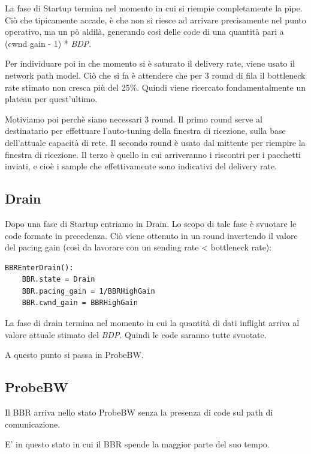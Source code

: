 La fase di Startup termina nel momento in cui si riempie completamente la pipe. Ciò che tipicamente accade, è che non si riesce ad arrivare precisamente nel punto operativo, ma un pò aldilà, generando così delle code di una quantità pari a (cwnd gain - 1) * \textit{BDP}. \bigskip

Per individuare poi in che momento si è saturato il delivery rate, viene usato il network path model.
Ciò che si fa è attendere che per 3 round di fila il bottleneck rate stimato non cresca più del 25\%. Quindi viene ricercato fondamentalmente un plateau per quest'ultimo. \bigskip

Motiviamo poi perchè siano necessari 3 round. Il primo round serve al destinatario per effettuare l'auto-tuning della finestra di ricezione, sulla base dell'attuale capacità di rete. Il secondo round è usato dal mittente per riempire la finestra di ricezione. Il terzo è quello in cui arriveranno i riscontri per i pacchetti inviati, e cioè i sample che effettivamente sono indicativi del delivery rate.

\subsection{Drain}

Dopo una fase di Startup entriamo in Drain. Lo scopo di tale fase è svuotare le code formate in precedenza. Ciò viene ottenuto in un round invertendo il valore del pacing gain (così da lavorare con un sending rate < bottleneck rate):

\begin{lstlisting}[caption=BBREnterDrain]
BBREnterDrain():
	BBR.state = Drain
	BBR.pacing_gain = 1/BBRHighGain
	BBR.cwnd_gain = BBRHighGain

\end{lstlisting}

La fase di drain termina nel momento in cui la quantità di dati inflight arriva al valore attuale stimato del \textit{BDP}. Quindi le code saranno tutte svuotate. \bigskip

A questo punto si passa in ProbeBW.

\subsection{ProbeBW} \label{ProbeBW}

Il BBR arriva nello stato ProbeBW senza la presenza di code sul path di comunicazione. \bigskip

E' in questo stato in cui il BBR spende la maggior parte del suo tempo. \bigskip

